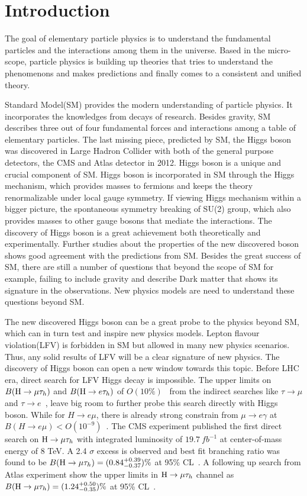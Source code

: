 
\chapter{Introduction}

The goal of elementary particle physics is to understand the fundamental particles and the interactions among them in the universe. Based in the micro-scope, particle physics is building up theories that tries to understand the phenomenons and makes predictions and finally comes to a consistent and unified theory. 

Standard Model(SM) provides the modern understanding of particle physics. It incorporates the knowledges from decays of research. Besides gravity, SM describes three out of four fundamental forces and interactions among a table of elementary particles. The last missing piece, predicted by SM, the Higgs boson was discovered in Large Hadron Collider with both of the general purpose detectors, the CMS and Atlas detector in 2012. Higgs boson is a unique and crucial component of SM. Higgs boson is incorporated in SM through the Higgs mechanism, which provides masses to fermions and keeps the theory renormalizable under local gauge symmetry. If viewing Higgs mechanism within a bigger picture, the spontaneous symmetry breaking of SU(2) group, which also provides masses to other gauge bosons that mediate the interactions. The discovery of Higgs boson is a great achievement both theoretically and experimentally. Further studies about the properties of the new discovered boson shows good agreement with the predictions from SM. Besides the great success of SM, there are still a number of questions that beyond the scope of SM for example, failing to include gravity and describe Dark matter that shows its signature in the observations. New physics models are need to understand these questions beyond SM.  

The new discovered Higgs boson can be a great probe to the physics beyond SM, which can in turn test and inspire new physics models. Lepton flavour violation(LFV) is forbidden in SM but allowed in many new physics scenarios. Thus, any solid results of LFV will be a clear signature of new physics. The discovery of Higgs boson can open a new window towards this topic. Before LHC era, direct search for LFV Higgs decay is impossible. The upper limits on $B(\mathrm{H}\to \mu\tau_{h})$ and $B(\mathrm{H} \to e \tau_{h})$ of $O(10\%)$~\cite{Blankenburg:2012ex,Harnik2012pb} from the indirect searches like $\tau \to \mu$ and $\tau \to e$~\cite{Celis:2013xja}, leave big room to further probe this search directly with Higgs boson. While for $H \to e\mu$, there is already strong constrain from $\mu \to e\gamma$ at $B(H\to e \mu)<O(10^{-9})$~\cite{TheMEG2016wtm}. The CMS experiment published the first direct search on $\mathrm{H}\to \mu\tau_{h}$ with integrated luminosity of $19.7~ fb^{-1}$ at center-of-mass energy of 8 TeV. A 2.4 $\sigma$ excess is observed and best fit branching ratio was found to be $B(\mathrm{H}\to \mu\tau_{h})=(0.84^{+0.39}_{-0.37})\%$ at 95\% CL~\cite{2015337}. A following up search from Atlas experiment show the upper limits in $\mathrm{H}\to \mu\tau_{h}$ channel as $B(\mathrm{H}\to \mu\tau_{h})=(1.24^{+0.50}_{-0.35})\%$ at 95\% CL~\cite{Aad2015gha}.
  

